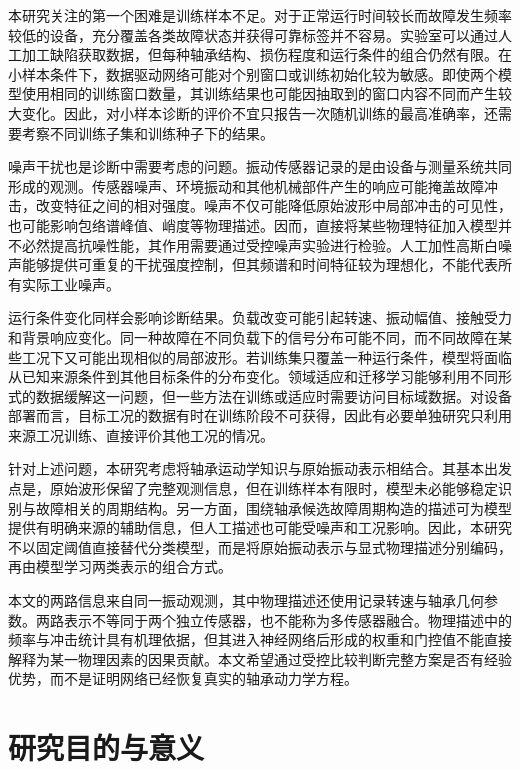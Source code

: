 \documentclass[UTF8,12pt,openany,twoside]{ctexbook}
\numberwithin{equation}{chapter}
\begin{document}
本研究关注的第一个困难是训练样本不足。对于正常运行时间较长而故障发生频率较低的设备，充分覆盖各类故障状态并获得可靠标签并不容易。实验室可以通过人工加工缺陷获取数据，但每种轴承结构、损伤程度和运行条件的组合仍然有限。在小样本条件下，数据驱动网络可能对个别窗口或训练初始化较为敏感。即使两个模型使用相同的训练窗口数量，其训练结果也可能因抽取到的窗口内容不同而产生较大变化。因此，对小样本诊断的评价不宜只报告一次随机训练的最高准确率，还需要考察不同训练子集和训练种子下的结果。

噪声干扰也是诊断中需要考虑的问题。振动传感器记录的是由设备与测量系统共同形成的观测。传感器噪声、环境振动和其他机械部件产生的响应可能掩盖故障冲击，改变特征之间的相对强度。噪声不仅可能降低原始波形中局部冲击的可见性，也可能影响包络谱峰值、峭度等物理描述。因而，直接将某些物理特征加入模型并不必然提高抗噪性能，其作用需要通过受控噪声实验进行检验。人工加性高斯白噪声能够提供可重复的干扰强度控制，但其频谱和时间特征较为理想化，不能代表所有实际工业噪声。

运行条件变化同样会影响诊断结果。负载改变可能引起转速、振动幅值、接触受力和背景响应变化。同一种故障在不同负载下的信号分布可能不同，而不同故障在某些工况下又可能出现相似的局部波形。若训练集只覆盖一种运行条件，模型将面临从已知来源条件到其他目标条件的分布变化。领域适应和迁移学习能够利用不同形式的数据缓解这一问题，但一些方法在训练或适应时需要访问目标域数据。对设备部署而言，目标工况的数据有时在训练阶段不可获得，因此有必要单独研究只利用来源工况训练、直接评价其他工况的情况。

针对上述问题，本研究考虑将轴承运动学知识与原始振动表示相结合。其基本出发点是，原始波形保留了完整观测信息，但在训练样本有限时，模型未必能够稳定识别与故障相关的周期结构。另一方面，围绕轴承候选故障周期构造的描述可为模型提供有明确来源的辅助信息，但人工描述也可能受噪声和工况影响。因此，本研究不以固定阈值直接替代分类模型，而是将原始振动表示与显式物理描述分别编码，再由模型学习两类表示的组合方式。

本文的两路信息来自同一振动观测，其中物理描述还使用记录转速与轴承几何参数。两路表示不等同于两个独立传感器，也不能称为多传感器融合。物理描述中的频率与冲击统计具有机理依据，但其进入神经网络后形成的权重和门控值不能直接解释为某一物理因素的因果贡献。本文希望通过受控比较判断完整方案是否有经验优势，而不是证明网络已经恢复真实的轴承动力学方程。

\section{研究目的与意义}\label{ux7814ux7a76ux76eeux7684ux4e0eux610fux4e49}
\end{document}
